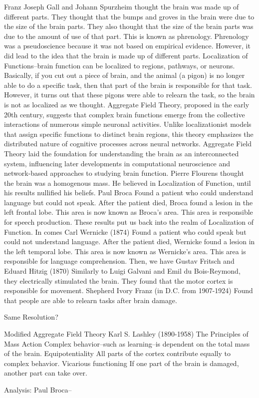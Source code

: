 Franz Joseph Gall and Johann Spurzheim thought the brain was made up of different parts.
    They thought that the bumps and groves in the brain were due to the size of the brain parts.
    They also thought that the size of the brain parts was due to the amount of use of that part.
    This is known as phrenology.
    Phrenology was a pseudoscience because it was not based on empirical evidence.
    However, it did lead to the idea that the brain is made up of different parts.
Localization of Functions--brain function can be localized to regions, pathways, or neurons.
    Basically, if you cut out a piece of brain, and the animal (a pigon) is no longer able to do a specific task, then that part of the brain is responsible for that task. 
    However, it turns out that these pigons were able to relearn the task, so the brain is not as localized as we thought.
Aggregate Field Theory, proposed in the early 20th century, suggests that complex brain functions emerge from the collective interactions of numerous simple neuronal activities. Unlike localizationist models that assign specific functions to distinct brain regions, this theory emphasizes the distributed nature of cognitive processes across neural networks. Aggregate Field Theory laid the foundation for understanding the brain as an interconnected system, influencing later developments in computational neuroscience and network-based approaches to studying brain function.
Pierre Flourens thought the brain was a homogenous mass.
    He believed in Localization of Function, until his results nullified his beliefs.
Paul Broca
    Found a patient who could understand language but could not speak.
    After the patient died, Broca found a lesion in the left frontal lobe.
    This area is now known as Broca's area.
    This area is responsible for speech production.
    These results put us back into the realm of Localization of Function.
In comes Carl Wernicke (1874)
    Found a patient who could speak but could not understand language.
    After the patient died, Wernicke found a lesion in the left temporal lobe.
    This area is now known as Wernicke's area.
    This area is responsible for language comprehension.
Then, we have Gustav Fritsch and Eduard Hitzig (1870)
    Similarly to Luigi Galvani and Emil du Bois-Reymond, they electrically stimulated the brain.
    They found that the motor cortex is responsible for movement.
Shepherd Ivory Franz (in D.C. from 1907-1924)
    Found that people are able to relearn tasks after brain damage.

Same Resolution?

Modified Aggregate Field Theory 
    Karl S. Lashley (1890-1958)
        The Principles of Mass Action
            Complex behavior--such as learning--is dependent on the total mass of the brain.
        Equipotentiality
            All parts of the cortex contribute equally to complex behavior.
        Vicarious functioning
            If one part of the brain is damaged, another part can take over.


Analysis:
    Paul Broca--
    
